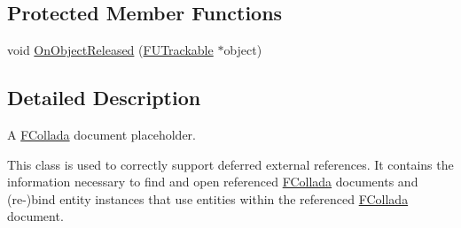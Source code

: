 \subsection*{Protected Member Functions}
\begin{DoxyCompactItemize}
\item 
void \hyperlink{classFCDPlaceHolder_af9c5b9d7ae1d24593ca7d75f338653a5}{OnObjectReleased} (\hyperlink{classFUTrackable}{FUTrackable} $\ast$object)
\end{DoxyCompactItemize}


\subsection{Detailed Description}
A \hyperlink{namespaceFCollada}{FCollada} document placeholder.

This class is used to correctly support deferred external references. It contains the information necessary to find and open referenced \hyperlink{namespaceFCollada}{FCollada} documents and (re-\/)bind entity instances that use entities within the referenced \hyperlink{namespaceFCollada}{FCollada} document. 

